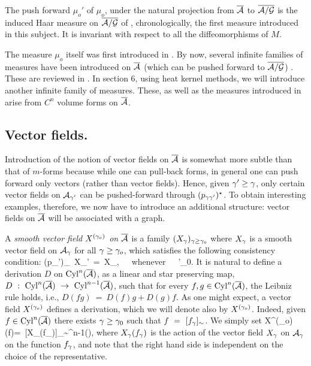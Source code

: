 The push forward $\mu_o'$ of $\mu_o$, under the natural projection
from ${\overline {{\cal A}}}$ to $\overline{{\cal A}/{\cal G}}$ is the induced Haar measure on $\overline{{\cal A}/{\cal G}}$ of
\cite{AL1}, chronologically, the first measure introduced in this 
subject. It is invariant with respect to all the diffeomorphisms of 
$M$.

The measure $\mu_o$ itself was first introduced in \cite{B1}.  By now,
several infinite families of measures have been introduced on ${\overline {{\cal A}}}$
(which can be pushed forward to $\overline{{\cal A}/{\cal G}}$) \cite{B1,B2,ALMMT2,ALMMT1}.
These are reviewed in \cite{AL2}. In section 6, using heat kernel
methods, we will introduce another infinite family of measures.
These, as well as the measures introduced in \cite{AL2} arise
from $C^{n}$ volume forms on ${\overline {{\cal A}}}$.

\subsection{Vector fields.}

Introduction of the notion of vector fields on ${\overline {{\cal A}}}$ is somewhat more
subtle than that of $m$-forms because while one can pull-back forms,
in general one can push forward only vectors (rather than vector
fields). Hence, given $\gamma'\ge\gamma$, only certain vector fields on
${\cal A}_{\gamma'}$ can be pushed-forward through $(p_{\gamma\gamma'})^\star$. To
obtain interesting examples, therefore, we now have to introduce an
additional structure: vector fields on ${\overline {{\cal A}}}$ will be associated with a
graph.

A {\it smooth vector field $X^{(\gamma_o)}$ on ${\overline {{\cal A}}}$} is a family
$(X_\gamma)_{\gamma\ge\gamma_o}$ where $X_\gamma$ is a smooth vector field on ${\cal A}_\gamma$
for all $\gamma\ge \gamma_o$, which satisfies the following consistency
condition:
\be \label{vecons}
(p_{\g\g'})_{\star}\ X_{\g'}\ =\ X_\g,\ \ \ {\rm whenever}\ \ \
\g'\ge\g\ge \g_0.
\ee
It is natural to define a derivation $D$ on ${\rm Cyl}^n({\overline {{\cal A}}})$, as a linear
and star preserving map, $D\:\ \Cyl^n(\Ab)\ \rightarrow\ \Cyl^{n-1}
(\Ab)$, such that for every $f,g\in {\rm Cyl}^n({\overline {{\cal A}}})$, the Leibniz rule
holds, i.e., $D(fg)\ =\ D(f)g + D(g)f$.  As one might expect, a vector
field $X^{(\gamma_o)}$ defines a derivation, which we will denote also by
$X^{(\gamma_o)}$.  Indeed, given $f\in{\rm Cyl}^n({\overline {{\cal A}}})$ there exists
$\gamma\ge\gamma_0$ such that $f\ =\ [f_\gamma]_\sim$. We simply set
\be
 X^{(\g_o)}(f)\:=\ [X_\g(f_\g)]_\sim\in\Cyl^{n-1}(\Ab),
\ee  
where $X_\gamma(f_\gamma)$ is the action of the vector field $X_\gamma$ on
${\cal A}_\gamma$ on the function $f_\gamma$, and note that the right hand side is
independent on the choice of the representative.

